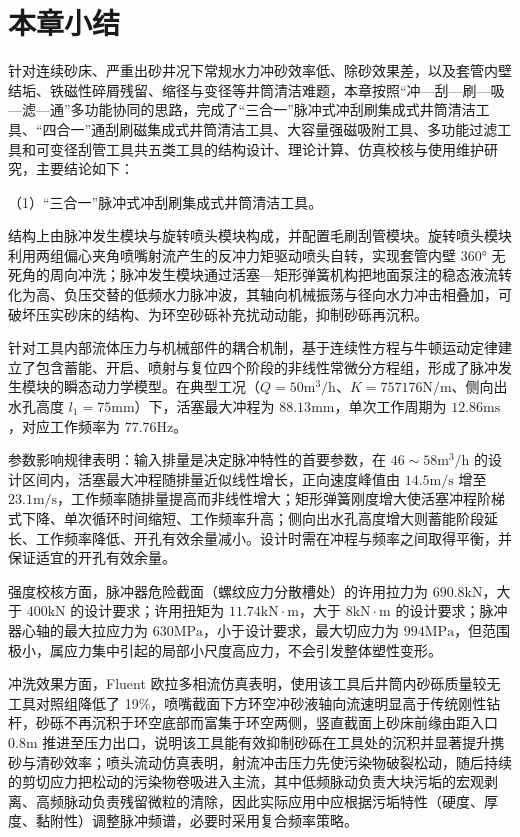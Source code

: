 \section{本章小结}

针对连续砂床、严重出砂井况下常规水力冲砂效率低、除砂效果差，以及套管内壁结垢、铁磁性碎屑残留、缩径与变径等井筒清洁难题，本章按照“冲—刮—刷—吸—滤—通”多功能协同的思路，完成了“三合一”脉冲式冲刮刷集成式井筒清洁工具、“四合一”通刮刷磁集成式井筒清洁工具、大容量强磁吸附工具、多功能过滤工具和可变径刮管工具共五类工具的结构设计、理论计算、仿真校核与使用维护研究，主要结论如下：

（1）“三合一”脉冲式冲刮刷集成式井筒清洁工具。

结构上由脉冲发生模块与旋转喷头模块构成，并配置毛刷刮管模块。旋转喷头模块利用两组偏心夹角喷嘴射流产生的反冲力矩驱动喷头自转，实现套管内壁 360° 无死角的周向冲洗；脉冲发生模块通过活塞—矩形弹簧机构把地面泵注的稳态液流转化为高、负压交替的低频水力脉冲波，其轴向机械振荡与径向水力冲击相叠加，可破坏压实砂床的结构、为环空砂砾补充扰动动能，抑制砂砾再沉积。
	
针对工具内部流体压力与机械部件的耦合机制，基于连续性方程与牛顿运动定律建立了包含蓄能、开启、喷射与复位四个阶段的非线性常微分方程组，形成了脉冲发生模块的瞬态动力学模型。在典型工况（$Q=50\mathrm{m^3/h}$、$K=757176\mathrm{N/m}$、侧向出水孔高度 $l_1=75\mathrm{mm}$）下，活塞最大冲程为 $88.13\mathrm{mm}$，单次工作周期为 $12.86\mathrm{ms}$，对应工作频率为 $77.76\mathrm{Hz}$。
	
参数影响规律表明：输入排量是决定脉冲特性的首要参数，在 $46\sim58\mathrm{m^3/h}$ 的设计区间内，活塞最大冲程随排量近似线性增长，正向速度峰值由 $14.5\mathrm{m/s}$ 增至 $23.1\mathrm{m/s}$，工作频率随排量提高而非线性增大；矩形弹簧刚度增大使活塞冲程阶梯式下降、单次循环时间缩短、工作频率升高；侧向出水孔高度增大则蓄能阶段延长、工作频率降低、开孔有效余量减小。设计时需在冲程与频率之间取得平衡，并保证适宜的开孔有效余量。

强度校核方面，脉冲器危险截面（螺纹应力分散槽处）的许用拉力为 $690.8\mathrm{kN}$，大于 $400\mathrm{kN}$ 的设计要求；许用扭矩为 $11.74\mathrm{kN\cdot m}$，大于 $8\mathrm{kN\cdot m}$ 的设计要求；脉冲器心轴的最大拉应力为 $630\mathrm{MPa}$，小于设计要求，最大切应力为 $994\mathrm{MPa}$，但范围极小，属应力集中引起的局部小尺度高应力，不会引发整体塑性变形。
	
冲洗效果方面，Fluent 欧拉多相流仿真表明，使用该工具后井筒内砂砾质量较无工具对照组降低了 19\%，喷嘴截面下方环空冲砂液轴向流速明显高于传统刚性钻杆，砂砾不再沉积于环空底部而富集于环空两侧，竖直截面上砂床前缘由距入口 $0.8\mathrm{m}$ 推进至压力出口，说明该工具能有效抑制砂砾在工具处的沉积并显著提升携砂与清砂效率；喷头流动仿真表明，射流冲击压力先使污染物破裂松动，随后持续的剪切应力把松动的污染物卷吸进入主流，其中低频脉动负责大块污垢的宏观剥离、高频脉动负责残留微粒的清除，因此实际应用中应根据污垢特性（硬度、厚度、黏附性）调整脉冲频谱，必要时采用复合频率策略。


